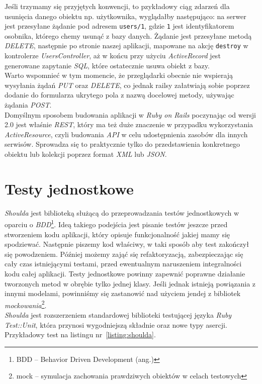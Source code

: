 \documentclass[12pt,twoside]{report}
\begin{document}
Jeśli trzymamy się przyjętych konwencji, to pzykładowy ciąg zdarzeń dla usunięcia danego
obiektu np. użytkownika, wyglądałby następująco: na serwer jest przesyłane żądanie pod
adresem \texttt{users/1}, gdzie \texttt{1} jest identyfikatorem osobnika, którego chemy
usunąć z bazy danych. Żądanie jest przesyłane metodą \emph{DELETE}, następnie po stronie
naszej aplikacji, mapowane na akcję \texttt{destroy} w kontrolerze \emph{UsersController},
aż w końcu przy użyciu \emph{ActiveRecord} jest generowane zapytanie \emph{SQL}, które
ostatecznie usuwa obiekt z bazy.\\
Warto wspomnieć w tym momencie, że przeglądarki obecnie nie wspierają wysyłania żądań
\emph{PUT} oraz \emph{DELETE}, co jednak railsy załatwiają sobie poprzez dodanie do
formularza ukrytego pola z nazwą docelowej metody, używając żądania \emph{POST}.\\
Domyślnym sposobem budowania aplikacji w \emph{Ruby on Rails} poczynając od wersji 2.0
jest właśnie \emph{REST}, który ma też duże znaczenie w przypadku wykorzystania \emph
{ActiveResource}, czyli budowania \emph{API} w celu udostępnienia zasobów dla innych
serwisów. Sprowadza się to praktycznie tylko do przedstawienia konkretnego obiektu lub
kolekcji poprzez format \emph{XML} lub \emph{JSON}.


\section{Testy jednostkowe}
\emph{Shoulda} jest biblioteką służącą do przeprowadzania testów jednostkowych w oparciu o
\emph{BDD}\footnote{BDD -- Behavior Driven Development (ang.)}. Ideą takiego podejścia
jest pisanie testów jeszcze przed stworzeniem kodu aplikacji, który opisuje funkcjonalność
jakiej mamy się spodziewać. Następnie piszemy kod właściwy, w taki sposób aby test
zakończył się powodzeniem. Później możemy zająć się refaktoryzacją, zabezpieczając się
cały czas istniejącymi testami, przed ewentualnym naruszeniem integralności kodu całej
aplikacji. Testy jednostkowe powinny zapewnić poprawne działanie tworzonych metod w
obrębie tylko jednej klasy. Jeśli jednak istnieją powiązania z innymi modelami, powinniśmy
się zastanowić nad użyciem jendej z bibliotek \emph{mockowania}\footnote{mock -- symulacja
zachowania prawdziwych obiektów w celach testowych}.\\
\emph{Shoulda} jest rozszerzeniem standardowej biblioteki testującej języka \emph{Ruby}
\emph{Test::Unit}, która przynosi wygodniejszą składnie oraz nowe typy asercji.
Przykładowy test na listingu nr~\ref{listing:shoulda}.
\end{document}
